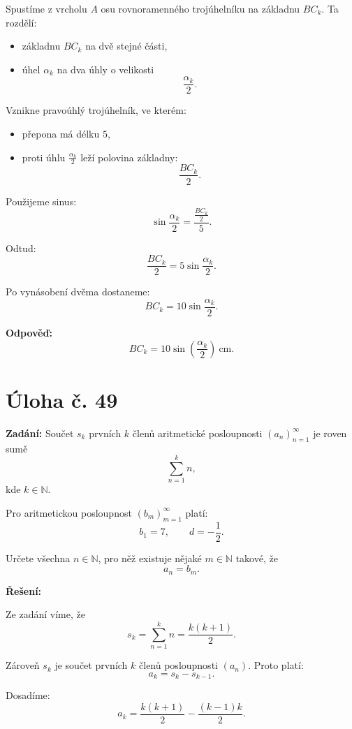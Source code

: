 \documentclass[12pt,a4paper]{article}
\begin{document}
Spustíme z vrcholu \(A\) osu rovnoramenného trojúhelníku na základnu \(BC_k\).  
Ta rozdělí:
\begin{itemize}
    \item základnu \(BC_k\) na dvě stejné části,
    \item úhel \(\alpha_k\) na dva úhly o velikosti
    \[
    \frac{\alpha_k}{2}.
    \]
\end{itemize}

Vznikne pravoúhlý trojúhelník, ve kterém:
\begin{itemize}
    \item přepona má délku \(5\),
    \item proti úhlu \(\frac{\alpha_k}{2}\) leží polovina základny:
    \[
    \frac{BC_k}{2}.
    \]
\end{itemize}

Použijeme sinus:
\[
\sin\frac{\alpha_k}{2}=\frac{\frac{BC_k}{2}}{5}.
\]

Odtud:
\[
\frac{BC_k}{2}=5\sin\frac{\alpha_k}{2}.
\]

Po vynásobení dvěma dostaneme:
\[
BC_k=10\sin\frac{\alpha_k}{2}.
\]

\bigskip

\textbf{Odpověď:}
\[
BC_k=10\sin\left(\frac{\alpha_k}{2}\right)\ \text{cm}.
\]


\newpage
\section*{Úloha č. 49}

\textbf{Zadání:}  
Součet \(s_k\) prvních \(k\) členů aritmetické posloupnosti \((a_n)_{n=1}^{\infty}\) je roven sumě
\[
\sum_{n=1}^{k} n,
\]
kde \(k\in\mathbb{N}\).

Pro aritmetickou posloupnost \((b_m)_{m=1}^{\infty}\) platí:
\[
b_1=7,\qquad d=-\frac12.
\]

Určete všechna \(n\in\mathbb{N}\), pro něž existuje nějaké \(m\in\mathbb{N}\) takové, že
\[
a_n=b_m.
\]

\bigskip

\textbf{Řešení:}

Ze zadání víme, že
\[
s_k=\sum_{n=1}^{k} n=\frac{k(k+1)}{2}.
\]

Zároveň \(s_k\) je součet prvních \(k\) členů posloupnosti \((a_n)\).  
Proto platí:
\[
a_k=s_k-s_{k-1}.
\]

Dosadíme:
\[
a_k=\frac{k(k+1)}{2}-\frac{(k-1)k}{2}.
\]
\end{document}
